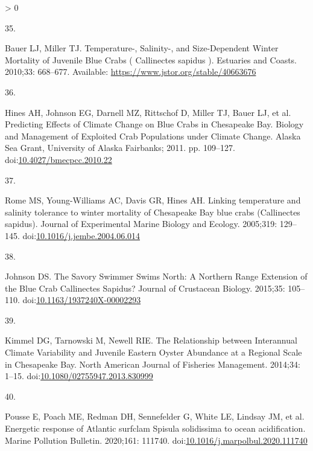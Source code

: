 \documentclass[
  10pt,
]{article}
\newlength{\cslhangindent}
\newlength{\csllabelwidth}
\newenvironment{CSLReferences}[2] %
 {%
  \setlength{\parindent}{0pt}
  \ifodd #1 \everypar{\setlength{\hangindent}{\cslhangindent}}\ignorespaces\fi
  \ifnum #2 > 0
  \setlength{\parskip}{#2\baselineskip}
  \fi
 }%
 {}
\newcommand{\CSLLeftMargin}[1]{\parbox[t]{\csllabelwidth}{#1}}
\newcommand{\CSLRightInline}[1]{\parbox[t]{\linewidth - \csllabelwidth}{#1}\break}
\begin{document}
\begin{CSLReferences}{0}{0}
\leavevmode\hypertarget{ref-bauer_temperature-_2010}{}%
\CSLLeftMargin{35. }
\CSLRightInline{Bauer LJ, Miller TJ. Temperature-, {Salinity}-, and
{Size}-{Dependent} {Winter} {Mortality} of {Juvenile} {Blue} {Crabs} (
{Callinectes} sapidus ). Estuaries and Coasts. 2010;33: 668--677.
Available: \url{https://www.jstor.org/stable/40663676}}

\leavevmode\hypertarget{ref-hines_predicting_2011}{}%
\CSLLeftMargin{36. }
\CSLRightInline{Hines AH, Johnson EG, Darnell MZ, Rittschof D, Miller
TJ, Bauer LJ, et al. Predicting {Effects} of {Climate} {Change} on
{Blue} {Crabs} in {Chesapeake} {Bay}. Biology and {Management} of
{Exploited} {Crab} {Populations} under {Climate} {Change}. Alaska Sea
Grant, University of Alaska Fairbanks; 2011. pp. 109--127.
doi:\href{https://doi.org/10.4027/bmecpcc.2010.22}{10.4027/bmecpcc.2010.22}}

\leavevmode\hypertarget{ref-rome_linking_2005}{}%
\CSLLeftMargin{37. }
\CSLRightInline{Rome MS, Young-Williams AC, Davis GR, Hines AH. Linking
temperature and salinity tolerance to winter mortality of {Chesapeake}
{Bay} blue crabs ({Callinectes} sapidus). Journal of Experimental Marine
Biology and Ecology. 2005;319: 129--145.
doi:\href{https://doi.org/10.1016/j.jembe.2004.06.014}{10.1016/j.jembe.2004.06.014}}

\leavevmode\hypertarget{ref-johnson_savory_2015}{}%
\CSLLeftMargin{38. }
\CSLRightInline{Johnson DS. The {Savory} {Swimmer} {Swims} {North}: {A}
{Northern} {Range} {Extension} of the {Blue} {Crab} {Callinectes}
{Sapidus}? Journal of Crustacean Biology. 2015;35: 105--110.
doi:\href{https://doi.org/10.1163/1937240X-00002293}{10.1163/1937240X-00002293}}

\leavevmode\hypertarget{ref-kimmel_relationship_2014}{}%
\CSLLeftMargin{39. }
\CSLRightInline{Kimmel DG, Tarnowski M, Newell RIE. The {Relationship}
between {Interannual} {Climate} {Variability} and {Juvenile} {Eastern}
{Oyster} {Abundance} at a {Regional} {Scale} in {Chesapeake} {Bay}.
North American Journal of Fisheries Management. 2014;34: 1--15.
doi:\href{https://doi.org/10.1080/02755947.2013.830999}{10.1080/02755947.2013.830999}}

\leavevmode\hypertarget{ref-pousse_energetic_2020}{}%
\CSLLeftMargin{40. }
\CSLRightInline{Pousse E, Poach ME, Redman DH, Sennefelder G, White LE,
Lindsay JM, et al. Energetic response of {Atlantic} surfclam {Spisula}
solidissima to ocean acidification. Marine Pollution Bulletin. 2020;161:
111740.
doi:\href{https://doi.org/10.1016/j.marpolbul.2020.111740}{10.1016/j.marpolbul.2020.111740}}


\end{CSLReferences}
\end{document}
